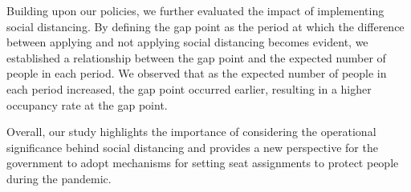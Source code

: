 Building upon our policies, we further evaluated the impact of implementing social distancing. By defining the gap point as the period at which the difference between applying and not applying social distancing becomes evident, we established a relationship between the gap point and the expected number of people in each period. We observed that as the expected number of people in each period increased, the gap point occurred earlier, resulting in a higher occupancy rate at the gap point.

Overall, our study highlights the importance of considering the operational significance behind social distancing and provides a new perspective for the government to adopt mechanisms for setting seat assignments to protect people during the pandemic. 

